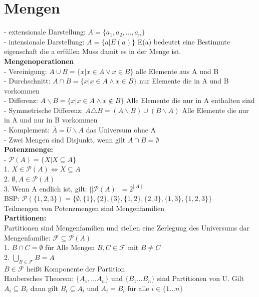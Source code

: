 \documentclass[a4paper]{scrartcl}
\begin{document}
\section{Mengen}
- extensionale Darstellung: $A = \{a_1, a_2,...,a_n\}$ \\
- intensionale Darstellung: $A = \{a | E(a)\}$ E(a) bedeutet eine Bestimmte eigenschaft die a erfüllen Muss damit es in der Menge ist.\\
\textbf{Mengenoperationen}\\
- Vereinigung: $A \cup B = \{x | x\in A \vee x \in B\}$ alle Elemente aus A und B\\
- Durchschnitt: $A \cap B = \{x | x\in A \wedge x \in B\}$ nur Elemente die in A und B vorkommen\\
- Differenz: $A \backslash B = \{x | x \in A \wedge x \notin B\}$ Alle Elemente die nur in A enthalten sind\\
- Symmetrische Differenz: $A \triangle B = (A \backslash B) \cup (B \backslash A)$ Alle Elemente die nur in A und nur in B vorkommen\\
- Komplement: $\bar A = U \backslash A$ das Universum ohne A\\
- Zwei Mengen sind Disjunkt, wenn gilt $A \cap B = \emptyset$\\
\textbf{Potenzmenge:}\\
- $\mathcal{P}(A) = \{X | X \subseteq A\}$\\
1. $X \in \mathcal{P}(A) \Leftrightarrow X \subseteq A$ \\ 
2. $\emptyset ,A\in \mathcal{P}(A)$\\
3. Wenn A endlich ist, gilt: $||\mathcal{P}(A)|| = 2^{||A||}$\\
BSP: $\mathcal{P}(\{1,2,3\}) = \{\emptyset,\{1\},\{2\},\{3\},\{1,2\},\{2,3\},\{1,3\},\{1,2,3\}\}$\\
Teilmengen von Potenzmengen sind Mengenfamilien\\
\textbf{Partitionen:}\\
Partitionen sind Mengenfamilien und stellen eine Zerlegung des Universums dar\\
Mengenfamilie: $\mathcal{F} \subseteq \mathcal{P}(A)$\\
1. $B \cap C = \emptyset$ für Alle Mengen $B,C\in \mathcal{F}$ mit $B \neq C$\\ 
2. $\bigcup \limits_{B\in \mathcal{F}} B = A$\\
$B \in \mathcal{F}$ heißt Komponente der Partition\\
Haubersches Theorem: $\{A_1,\dots A_n\}$ und $\{B_1\dots B_n\}$ sind Partitionen von U. Gilt $A_i \subseteq B_i$ dann gilt $B_i \subseteq A_i$ und $A_i = B_i$ für alle $i\in\{1\dots n\}$\\
\end{document}
